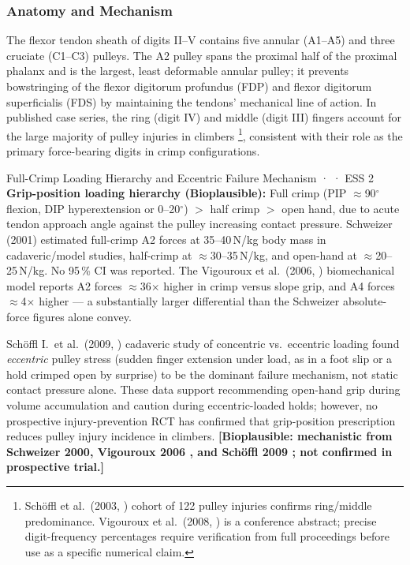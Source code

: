 \subsubsection{Anatomy and Mechanism}

The flexor tendon sheath of digits II--V contains five annular (A1--A5) and three cruciate (C1--C3) pulleys. The A2 pulley spans the proximal half of the proximal phalanx and is the largest, least deformable annular pulley; it prevents bowstringing of the flexor digitorum profundus (FDP) and flexor digitorum superficialis (FDS) by maintaining the tendons' mechanical line of action. In published case series, the ring (digit IV) and middle (digit III) fingers account for the large majority of pulley injuries in climbers \cite{SHWS03,VQPC08}\footnote{Sch\"{o}ffl et al.\ (2003, \cite{SHWS03}) cohort of 122 pulley injuries confirms ring/middle predominance. Vigouroux et al.\ (2008, \cite{VQPC08}) is a conference abstract; precise digit-frequency percentages require verification from full proceedings before use as a specific numerical claim.}, consistent with their role as the primary force-bearing digits in crimp configurations.

\begin{bioplausbox}{Full-Crimp Loading Hierarchy and Eccentric Failure Mechanism · \bioplausible · ESS 2}
\textbf{Grip-position loading hierarchy (Bioplausible):} Full crimp (PIP $\approx$90$^\circ$ flexion, DIP hyperextension or 0--20$^\circ$) $>$ half crimp $>$ open hand, due to acute tendon approach angle against the pulley increasing contact pressure. Schweizer (2001) estimated full-crimp A2 forces at 35--40\,N/kg body mass in cadaveric/model studies, half-crimp at $\approx$30--35\,N/kg, and open-hand at $\approx$20--25\,N/kg. No 95\,\% CI was reported. The Vigouroux et al.\ (2006, \cite{VQLVM06}) biomechanical model reports A2 forces $\approx$36$\times$ higher in crimp versus slope grip, and A4 forces $\approx$4$\times$ higher --- a substantially larger differential than the Schweizer absolute-force figures alone convey.

Sch\"{o}ffl I.\ et al.\ (2009, \cite{SOJ+09}) cadaveric study of concentric vs.\ eccentric loading found \textit{eccentric} pulley stress (sudden finger extension under load, as in a foot slip or a hold crimped open by surprise) to be the dominant failure mechanism, not static contact pressure alone. These data support recommending open-hand grip during volume accumulation and caution during eccentric-loaded holds; however, no prospective injury-prevention RCT has confirmed that grip-position prescription reduces pulley injury incidence in climbers. \textbf{[Bioplausible: mechanistic from Schweizer 2000, Vigouroux 2006 \cite{VQLVM06}, and Sch\"{o}ffl 2009 \cite{SOJ+09}; not confirmed in prospective trial.]}
\end{bioplausbox}


